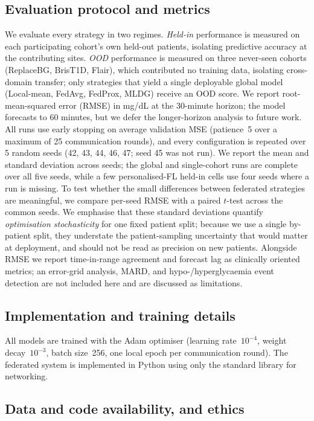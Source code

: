 \documentclass[10pt,letterpaper]{article}
\begin{document}
\subsection*{Evaluation protocol and metrics}

We evaluate every strategy in two regimes. \emph{Held-in} performance is measured
on each participating cohort's own held-out patients, isolating predictive
accuracy at the contributing sites. \emph{OOD} performance is measured on three
never-seen cohorts (ReplaceBG, BrisT1D, Flair), which contributed no training
data, isolating cross-domain transfer; only strategies that yield a single
deployable global model (Local-mean, FedAvg, FedProx, MLDG) receive an OOD score.
We report root-mean-squared error (RMSE) in mg/dL at the 30-minute horizon; the
model forecasts to 60 minutes, but we defer the longer-horizon analysis to future
work. All runs use early stopping on average validation MSE (patience~5 over a
maximum of 25 communication rounds), and every configuration is repeated over 5
random seeds (42, 43, 44, 46, 47; seed 45 was not run). We report the mean and
standard deviation across seeds; the global and single-cohort runs are complete
over all five seeds, while a few personalised-FL held-in cells use four seeds
where a run is missing. To test whether the small differences between federated
strategies are meaningful, we compare per-seed RMSE with a paired $t$-test across
the common seeds. We emphasise that these standard deviations quantify
\emph{optimisation stochasticity} for one fixed patient split; because we use a
single by-patient split, they understate the patient-sampling uncertainty that
would matter at deployment, and should not be read as precision on new patients.
Alongside RMSE we report time-in-range agreement and forecast lag as
clinically oriented metrics; an error-grid analysis, MARD, and
hypo-/hyperglycaemia event detection are not included here and are discussed as
limitations.

\subsection*{Implementation and training details}

All models are trained with the Adam optimiser (learning rate~$10^{-4}$, weight
decay~$10^{-3}$, batch size~256, one local epoch per communication round). The
federated system is implemented in Python using only the standard library for
networking.

\subsection*{Data and code availability, and ethics}
\end{document}
